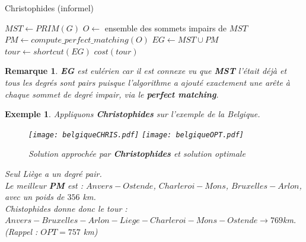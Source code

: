 \documentclass[12pt]{article}
\newtheorem{exemple}{Exemple}[section]
\newtheorem{rem}{Remarque}[section]
\begin{document}
\begin{algorithm}[H]
\caption{Christophides (informel)}
\begin{algorithmic}[1]
\STATE $MST\leftarrow PRIM(G)$
\STATE $O \leftarrow$ ensemble des sommets impairs de $MST$
\STATE $PM\leftarrow compute\_perfect\_matching(O)$
\STATE $EG\leftarrow MST\cup PM$
\STATE $tour \leftarrow shortcut(EG)$
\RETURN $cost(tour)$
\end{algorithmic}
\end{algorithm}

\begin{rem} \textbf{EG} est eulérien car il est connexe vu que \textbf{MST}  l'était déjà et tous les degrés sont pairs puisque
l'algorithme a ajouté exactement une arête à chaque sommet de degré impair, via le \textbf{perfect matching}.
\end{rem}

\begin{exemple} Appliquons \textbf{Christophides} sur l'exemple de la Belgique. \\
\begin{figure}[H]
    \begin{center}
    \texttt{[image: belgiqueCHRIS.pdf]}
    \texttt{[image: belgiqueOPT.pdf]}
    \caption{Solution approchée par \textbf{Christophides} et solution optimale}
    \end{center}
\end{figure}

\noindent Seul Liège a un degré pair. \\
Le meilleur \textbf{PM} est : $Anvers-Ostende$, $Charleroi-Mons$, $Bruxelles-Arlon$, avec un poids de $356$ km. \\
Chistophides donne donc le tour : \\ $Anvers-Bruxelles-Arlon-Liege-Charleroi-Mons-Ostende \rightarrow 769$km. \\
\textit{(Rappel : $OPT = 757$ km)}
\end{exemple}
\end{document}
